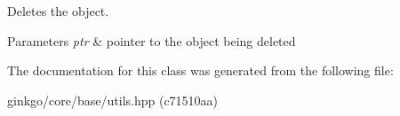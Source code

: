 Deletes the object. 


\begin{DoxyParams}{Parameters}
{\em ptr} & pointer to the object being deleted \\
\hline
\end{DoxyParams}


The documentation for this class was generated from the following file\+:\begin{DoxyCompactItemize}
\item 
ginkgo/core/base/utils.\+hpp (c71510aa)\end{DoxyCompactItemize}

